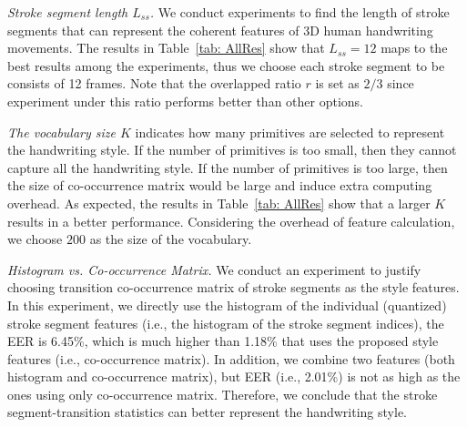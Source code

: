  \textit{Stroke segment length $L_{ss}$.}  We conduct experiments to find the length of stroke segments that can represent the coherent features of 3D human handwriting movements. The results in Table~\ref{tab: AllRes} show that $L_{ss} = 12$ maps to the best results among the experiments, thus we choose each stroke segment to be consists of 12 frames. Note that the overlapped ratio $r$ is set as $2/3$ since experiment under this ratio performs better than other options. 

 \textit{The vocabulary size $K$} indicates how many primitives are selected to represent the handwriting style. If the number of primitives is too small, then they cannot capture all the handwriting style. If the number of primitives is too large, then the size of co-occurrence matrix would be large and induce extra computing overhead. As expected, the results in Table~\ref{tab: AllRes} show that a larger $K$ results in a better performance. Considering the overhead of feature calculation, we choose $200$ as the size of the vocabulary. 

\textit{Histogram vs. Co-occurrence Matrix.} We conduct an
experiment to justify choosing transition co-occurrence matrix
of stroke segments as the style features. In this experiment, we
directly use the histogram of the individual (quantized) stroke segment
features (i.e., the histogram of the stroke segment indices), the EER is 6.45\%, which is much higher
than 1.18\% that uses the proposed style features (i.e., co-occurrence matrix). In addition, we combine two features (both histogram and co-occurrence matrix), but EER (i.e., 2.01\%) is not as high as the ones using only co-occurrence matrix. Therefore, we conclude that the stroke segment-transition statistics can better represent the handwriting style.











